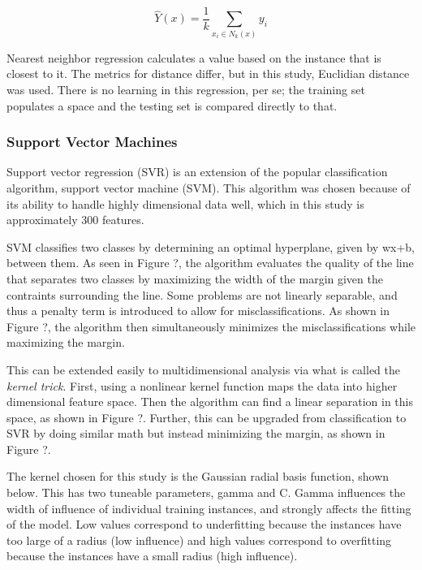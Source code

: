 

\begin{equation}
\hat{Y}(x) = \frac{1}{k} \sum_{x_i \in N_k(x)} y_i
\end{equation}

Nearest neighbor regression calculates a value based on the instance that is
closest to it. The metrics for distance differ, but in this study, Euclidian
distance was used. There is no learning in this regression, per se; the
training set populates a space and the testing set is compared directly to
that. \cite{elements_stats} 


\subsubsection{Support Vector Machines}
\label{sec:svm}


Support vector regression (SVR) is an extension of the popular classification
algorithm, support vector machine (SVM).  This algorithm was chosen because of
its ability to handle highly dimensional data well, which in this study is
approximately 300 features. 

SVM classifies two classes by determining an optimal hyperplane, given by wx+b,
between them.  As seen in Figure ?, the algorithm evaluates the quality of the
line that separates two classes by maximizing the width of the margin given the
contraints surrounding the line.  Some problems are not linearly separable, and
thus a penalty term is introduced to allow for misclassifications. As shown in
Figure ?, the algorithm then simultaneously minimizes the misclassifications
while maximizing the margin. 

This can be extended easily to multidimensional analysis via what is called the
\textit{kernel trick}.  First, using a nonlinear kernel function maps the data
into higher dimensional feature space. Then the algorithm can find a linear
separation in this space, as shown in Figure ?. Further, this can be upgraded
from classification to SVR by doing similar math but instead minimizing the
margin, as shown in Figure ?. 

The kernel chosen for this study is the Gaussian radial basis function, shown
below. This has two tuneable parameters, gamma and C. Gamma influences the
width of influence of individual training instances, and strongly affects the
fitting of the model. Low values correspond to underfitting because the
instances have too large of a radius (low influence) and high values correspond
to overfitting because the instances have a small radius (high influence). 

